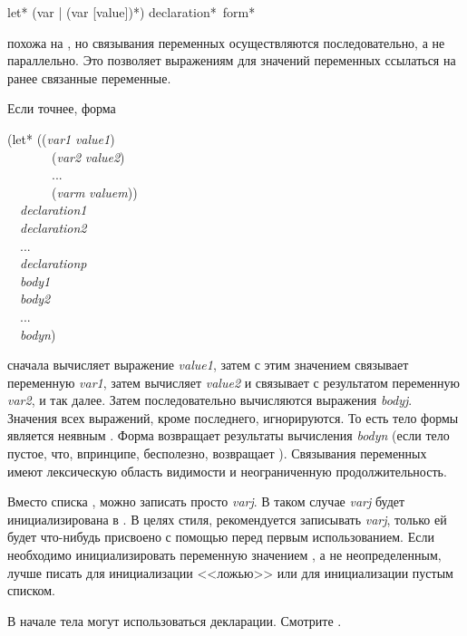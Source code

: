 \begin{defspec}
let* ({var | (var [value])}*) {declaration}* {\,form}*

 похожа на , но связывания переменных осуществляются
последовательно, а не параллельно. Это позволяет выражениям для значений
переменных ссылаться на ранее связанные переменные.

Если точнее, форма
\begin{lisp}
(let* ((\emph{var1} \emph{value1}) \\
~~~~~~~(\emph{var2} \emph{value2}) \\
~~~~~~~... \\
~~~~~~~(\emph{varm} \emph{valuem})) \\
~~\emph{declaration1} \\
~~\emph{declaration2} \\
~~... \\
~~\emph{declarationp} \\
~~\emph{body1} \\
~~\emph{body2} \\
~~... \\
~~\emph{bodyn})
\end{lisp}
сначала вычисляет выражение \emph{value1}, затем с этим значением связывает
переменную \emph{var1}, затем вычисляет \emph{value2} и связывает с 
результатом переменную \emph{var2}, и так далее.
Затем последовательно вычисляются выражения \emph{bodyj}.
Значения всех выражений, кроме последнего, игнорируются. То есть тело формы
 является неявным .
Форма  возвращает результаты вычисления \emph{bodyn} (если тело
пустое, что, впринципе, бесполезно,  возвращает {\false}).
Связывания переменных имеют лексическую область видимости и неограниченную продолжительность.

Вместо списка , можно записать просто
\emph{varj}.
В таком случае \emph{varj} будет инициализирована в {\false}. В целях стиля,
рекомендуется записывать \emph{varj}, только ей будет что-нибудь присвоено с
помощью  перед первым использованием.
Если необходимо инициализировать переменную значением {\nil}, а не
неопределенным, лучше писать  для инициализации
<<ложью>> или  для инициализации пустым
списком.

В начале тела  могут использоваться декларации. Смотрите .
\end{defspec}

